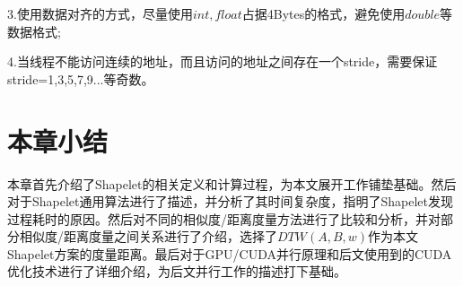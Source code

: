 3.使用数据对齐的方式，尽量使用$int,float$占据4Bytes的格式，避免使用$double$等数据格式;

4.当线程不能访问连续的地址，而且访问的地址之间存在一个stride，需要保证stride=1,3,5,7,9...等奇数。


\section{本章小结}

本章首先介绍了Shapelet的相关定义和计算过程，为本文展开工作铺垫基础。然后对于Shapelet通用算法进行了描述，并分析了其时间复杂度，指明了Shapelet发现过程耗时的原因。然后对不同的相似度/距离度量方法进行了比较和分析，并对部分相似度/距离度量之间关系进行了介绍，选择了$DTW(A,B,w)$作为本文Shapelet方案的度量距离。最后对于GPU/CUDA并行原理和后文使用到的CUDA优化技术进行了详细介绍，为后文并行工作的描述打下基础。


